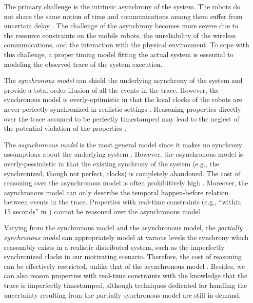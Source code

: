 \documentclass[10pt,conference,compsocconf,letterpaper]{IEEEtran}
\begin{document}
The primary challenge is the intrinsic asynchrony of the system. The robots do not share the same notion of time and communications among them suffer from uncertain delay \cite{Corbett12, Duggirala12, Stoller00, Kshemkalyani13}. The challenge of the asynchrony becomes more severe due to the resource constraints on the mobile robots, the unreliability of the wireless communications, and the interaction with the physical environment. To cope with this challenge, a proper timing model fitting the actual system is essential to modeling the observed trace of the system execution.

The \textit{synchronous model} can shield the underlying asynchrony of the system and provide a total-order illusion of all the events in the trace. However, the synchronous model is overly-optimistic in that the local clocks of the robots are never perfectly synchronized in realistic settings \cite{Duggirala12, Corbett12}. Reasoning properties directly over the trace assumed to be perfectly timestamped may lead to the neglect of the potential violation of the properties \cite{Kshemkalyani13}.

The \textit{asynchronous model} is the most general model since it makes no synchrony assumptions about the underlying system \cite{Gartner99}. However, the asynchronous model is overly-pessimistic in that the existing synchrony of the system (e.g., the synchronized, though not perfect, clocks) is completely abandoned. The cost of reasoning over the asynchronous model is often prohibitively high \cite{Yang13, Wei12}. Moreover, the asynchronous model can only describe the temporal happen-before relation between events in the trace. Properties with real-time constraints (e.g., ``within 15 seconds'' in ) cannot be reasoned over the asynchronous model.

Varying from the synchronous model and the asynchronous model, the \textit{partially synchronous model} can appropriately model at various levels the synchrony which reasonably exists in a realistic distributed system, such as the imperfectly synchronized clocks in our motivating scenario. Therefore, the cost of reasoning can be effectively restricted, unlike that of the asynchronous model \cite{Stoller00}. Besides, we can also reason properties with real-time constraints with the knowledge that the trace is imperfectly timestamped, although techniques dedicated for handling the uncertainty resulting from the partially synchronous model are still in demand.
\end{document}
